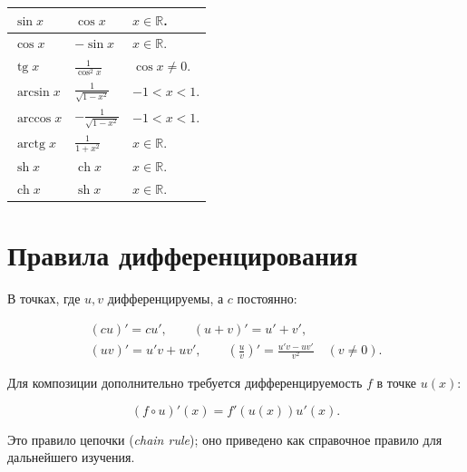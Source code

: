 \begin{longtable}{|p{.25\linewidth}|p{.29\linewidth}|p{.36\linewidth}|}
\(\displaystyle \sin x\)&\(\displaystyle \cos x\)&\(x\in\mathbb R\).\\[3pt]\hline

\(\displaystyle \cos x\)&\(\displaystyle -\sin x\)&\(x\in\mathbb R\).\\[3pt]\hline

\(\displaystyle \operatorname{tg}x\)&\(\displaystyle \frac1{\cos^2x}\)&\(\cos x\ne0\).\\[3pt]\hline

\(\displaystyle \arcsin x\)&\(\displaystyle \frac1{\sqrt{1-x^2}}\)&\(-1<x<1\).\\[3pt]\hline

\(\displaystyle \arccos x\)&\(\displaystyle -\frac1{\sqrt{1-x^2}}\)&\(-1<x<1\).\\[3pt]\hline

\(\displaystyle \operatorname{arctg}x\)&\(\displaystyle \frac1{1+x^2}\)&\(x\in\mathbb R\).\\[3pt]\hline

\(\displaystyle \operatorname{sh}x\)&\(\displaystyle \operatorname{ch}x\)&\(x\in\mathbb R\).\\[3pt]\hline

\(\displaystyle \operatorname{ch}x\)&\(\displaystyle \operatorname{sh}x\)&\(x\in\mathbb R\).\\[3pt]\hline

\end{longtable}\endgroup

\section*{Правила дифференцирования}

В точках, где \(u,v\) дифференцируемы, а \(c\) постоянно:

\[\begin{gathered}(cu)'=cu',\qquad (u+v)'=u'+v',\\(uv)'=u' v+uv',\qquad \left(\frac uv\right)'=\frac{u' v-uv'}{v^2}\quad(v\ne0).\end{gathered}\]

Для композиции дополнительно требуется дифференцируемость \(f\) в точке \(u(x)\):

\[(f\circ u)'(x)=f'(u(x))u'(x).\]

Это правило цепочки (\emph{chain rule}); оно приведено как справочное правило для дальнейшего изучения.

